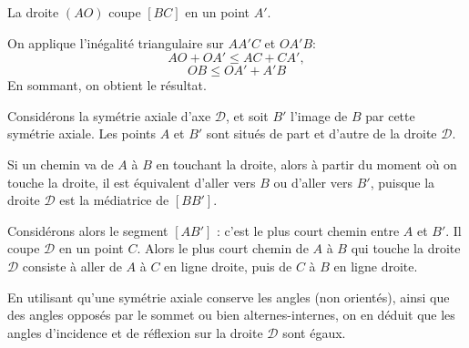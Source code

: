 \begin{Soln}{29}
La droite $(AO)$ coupe $[BC]$ en un point $A'$.
\begin{center}
\end{center}
On applique l'inégalité triangulaire sur $AA'C$ et $OA'B$:
\[ AO+OA' \leq AC+CA',\]
\[ OB \leq OA'+A'B\]
En sommant, on obtient le résultat.
\end{Soln}
\begin{Soln}{31}
Considérons la symétrie axiale d'axe $\mathcal D$, et soit $B'$ l'image de $B$ par cette symétrie axiale.  Les points $A$ et  $B'$ sont situés de part et d'autre de la droite $\mathcal D$.

Si un chemin va de $A$ à $B$ en touchant la droite, alors à partir du moment où on touche la droite, il est équivalent d'aller vers $B$ ou d'aller vers $B'$, puisque la droite $\mathcal D$ est la médiatrice de $[BB']$.


Considérons alors le segment $[AB']$ : c'est le plus court chemin entre $A$ et $B'$. Il coupe $\mathcal D$ en un point $C$. Alors le plus court chemin de $A$ à $B$ qui touche la droite $\mathcal D$ consiste à aller de $A$ à $C$ en ligne droite, puis de $C$ à $B$ en ligne droite.

En utilisant qu'une symétrie axiale conserve les angles (non orientés), ainsi que des angles opposés par le sommet ou bien alternes-internes, on en déduit que les angles d'incidence et de réflexion sur la droite $\mathcal D$ sont égaux.

\end{Soln}
